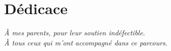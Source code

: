 \chapter*{Dédicace}
\thispagestyle{empty}

\vspace*{5cm}
\begin{center}
\textit{À mes parents, pour leur soutien indéfectible.}\\[0.5cm]
\textit{À tous ceux qui m'ont accompagné dans ce parcours.}
\end{center}
